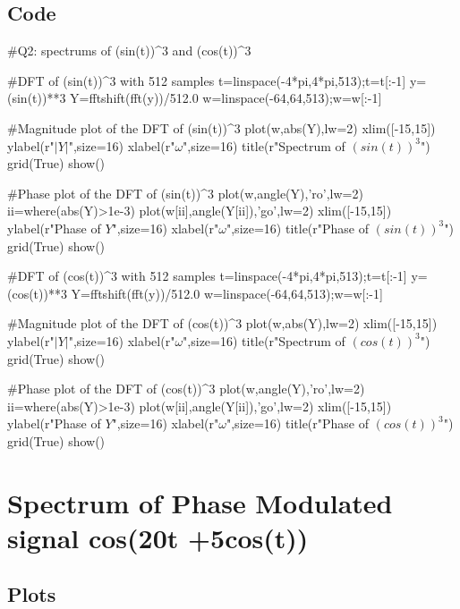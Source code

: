 \documentclass[11pt]{article}
\begin{document}
\subsection{Code}
\begin{python}
#Q2: spectrums of (sin(t))^3 and (cos(t))^3

#DFT of (sin(t))^3 with 512 samples
t=linspace(-4*pi,4*pi,513);t=t[:-1]
y=(sin(t))**3
Y=fftshift(fft(y))/512.0
w=linspace(-64,64,513);w=w[:-1]

#Magnitude plot of the DFT of (sin(t))^3
plot(w,abs(Y),lw=2)
xlim([-15,15])
ylabel(r"$|Y|$",size=16)
xlabel(r"$\omega$",size=16)
title(r"Spectrum of $(sin(t))^3$")
grid(True)
show()

#Phase plot of the DFT of (sin(t))^3
plot(w,angle(Y),'ro',lw=2)
ii=where(abs(Y)>1e-3)
plot(w[ii],angle(Y[ii]),'go',lw=2)
xlim([-15,15])
ylabel(r"Phase of $Y$",size=16)
xlabel(r"$\omega$",size=16)
title(r"Phase of $(sin(t))^3$")
grid(True)
show()



#DFT of (cos(t))^3 with 512 samples
t=linspace(-4*pi,4*pi,513);t=t[:-1]
y=(cos(t))**3
Y=fftshift(fft(y))/512.0
w=linspace(-64,64,513);w=w[:-1]

#Magnitude plot of the DFT of (cos(t))^3
plot(w,abs(Y),lw=2)
xlim([-15,15])
ylabel(r"$|Y|$",size=16)
xlabel(r"$\omega$",size=16)
title(r"Spectrum of $(cos(t))^3$")
grid(True)
show()

#Phase plot of the DFT of (cos(t))^3
plot(w,angle(Y),'ro',lw=2)
ii=where(abs(Y)>1e-3)
plot(w[ii],angle(Y[ii]),'go',lw=2)
xlim([-15,15])
ylabel(r"Phase of $Y$",size=16)
xlabel(r"$\omega$",size=16)
title(r"Phase of $(cos(t))^3$")
grid(True)
show()
\end{python}



\section{Spectrum of Phase Modulated signal cos(20t +5cos(t))}
\subsection{Plots}
\end{document}
